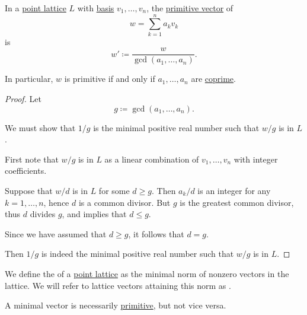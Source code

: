 \begin{proposition}\label{thm:primitive_lattice_vector_via_basis}
  In a \hyperref[def:point_lattice]{point lattice} \( L \) with \hyperref[def:point_lattice_basis]{basis} \( v_1, \ldots, v_n \), the \hyperref[def:primitive_lattice_vector]{primitive vector} of
  \begin{equation*}
    w = \sum_{k=1}^n a_k v_k
  \end{equation*}
  is
  \begin{equation}\label{eq:thm:primitive_lattice_vector_via_basis}
    w' \coloneqq \frac w {\gcd(a_1, \ldots, a_n)}.
  \end{equation}
\end{proposition}
\begin{comments}
  \item In particular, \( w \) is primitive if and only if \( a_1, \ldots, a_n \) are \hyperref[def:coprime_elements]{coprime}.
\end{comments}
\begin{proof}
  Let
  \begin{equation*}
    g \coloneqq \gcd(a_1, \ldots, a_n).
  \end{equation*}

  We must show that \( 1 / g \) is the minimal positive real number such that \( w / g \) is in \( L \).

  First note that \( w / g \) is in \( L \) as a linear combination of \( v_1, \ldots, v_n \) with integer coefficients.

  Suppose that \( w / d \) is in \( L \) for some \( d \geq g \). Then \( a_k / d \) is an integer for any \( k = 1, \ldots, n \), hence \( d \) is a common divisor. But \( g \) is the greatest common divisor, thus \( d \) divides \( g \), and  implies that \( d \leq g \).

  Since we have assumed that \( d \geq g \), it follows that \( d = g \).

  Then \( 1 / g \) is indeed the minimal positive real number such that \( w / g \) is in \( L \).
\end{proof}

\begin{definition}\label{def:minimal_lattice_vector}
  We define the  of a \hyperref[def:point_lattice]{point lattice} as the minimal norm of nonzero vectors in the lattice. We will refer to lattice vectors attaining this norm as .
\end{definition}
\begin{comments}
  \item A minimal vector is necessarily \hyperref[def:primitive_lattice_vector]{primitive}, but not vice versa.
\end{comments}

